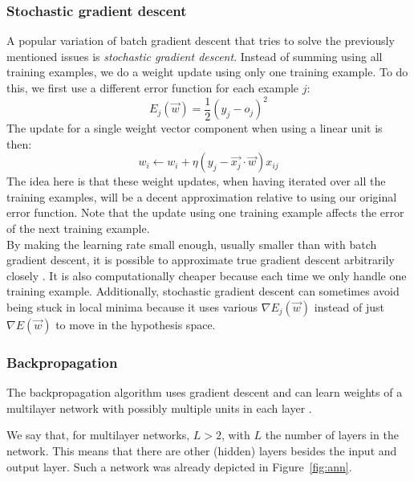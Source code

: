 \subsubsection{Stochastic gradient descent} %
\label{ssub:stochastic_gradient_descent}
A popular variation of batch gradient descent that tries to solve the previously mentioned issues is \textit{stochastic gradient descent}. Instead of summing using all training examples, we do a weight update using only one training example. To do this, we first use a different error function for each example $j$:
\begin{equation}
    E_j(\overrightarrow{w}) = \frac{1}{2}(y_j - o_j)^2
\end{equation}
The update for a single weight vector component when using a linear unit is then:
\begin{equation}
    w_i \gets w_i + \eta (y_j- \overrightarrow{x_j} \cdot \overrightarrow{w})x_{ij}
\end{equation}
The idea here is that these weight updates, when having iterated over all the training examples, will be a decent approximation relative to using our original error function. Note that the update using one training example affects the error of the next training example.\\

By making the learning rate small enough, usually smaller than with batch gradient descent, it is possible to approximate true gradient descent arbitrarily closely \citep{ML}. It is also computationally cheaper because each time we only handle one training example. Additionally, stochastic gradient descent can sometimes avoid being stuck in local minima because it uses various $\nabla E_j(\overrightarrow{w})$ instead of just $\nabla E(\overrightarrow{w})$ to move in the hypothesis space.

\subsubsection{Backpropagation} %
\label{ssub:backpropagation}
The backpropagation algorithm uses gradient descent and can learn weights of a multilayer network with possibly multiple units in each layer \citep{rumelhart1986learning}.

We say that, for multilayer networks, $L>2$, with $L$ the number of layers in the network. This means that there are other (hidden) layers besides the input and output layer. Such a network was already depicted in Figure~\ref{fig:ann}.

